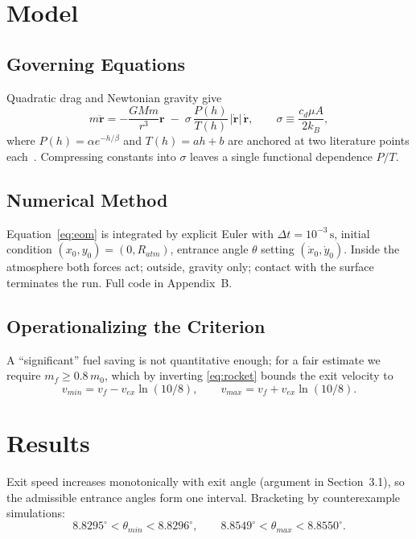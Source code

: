 \documentclass[11pt,a4paper]{article}
\numberwithin{equation}{section} %
\newcommand{\vect}[1]{\boldsymbol{#1}}
\newcommand{\unit}[1]{\,\mathrm{#1}}
\begin{document}
\section{Model}
\subsection{Governing Equations}
Quadratic drag and Newtonian gravity give
\begin{equation}
  m\ddot{\vect{r}} = -\frac{GMm}{r^3}\vect{r}
  \;-\; \sigma\,\frac{P(h)}{T(h)}\,|\dot{\vect r}|\,\dot{\vect{r}},
  \qquad \sigma \equiv \frac{c_d \mu A}{2k_B},
  \label{eq:eom}
\end{equation}
where $P(h)=\alpha e^{-h/\beta}$ and $T(h)=ah+b$ are anchored at two literature
points each~\cite{Lunine1993}. Compressing constants into $\sigma$ leaves a
single functional dependence $P/T$.

\subsection{Numerical Method}
Equation~\eqref{eq:eom} is integrated by explicit Euler with
$\Delta t = 10^{-3}\unit{s}$, initial condition $(x_0,y_0)=(0,R_{atm})$,
entrance angle $\theta$ setting $(\dot x_0,\dot y_0)$. Inside the atmosphere
both forces act; outside, gravity only; contact with the surface terminates
the run. Full code in Appendix~B.

\subsection{Operationalizing the Criterion}
A ``significant'' fuel saving is not quantitative enough; for a fair estimate
we require $m_f \ge 0.8\, m_0$, which by inverting \eqref{eq:rocket} bounds the
exit velocity to
\begin{equation}
  v_{min} = v_f - v_{ex}\ln(10/8), \qquad
  v_{max} = v_f + v_{ex}\ln(10/8).
\end{equation}

\section{Results}
Exit speed increases monotonically with exit angle (argument in
Section~3.1), so the admissible entrance angles form one interval. Bracketing
by counterexample simulations:
\begin{equation}
  8.8295^\circ < \theta_{min} < 8.8296^\circ, \qquad
  8.8549^\circ < \theta_{max} < 8.8550^\circ .
\end{equation}
\end{document}
